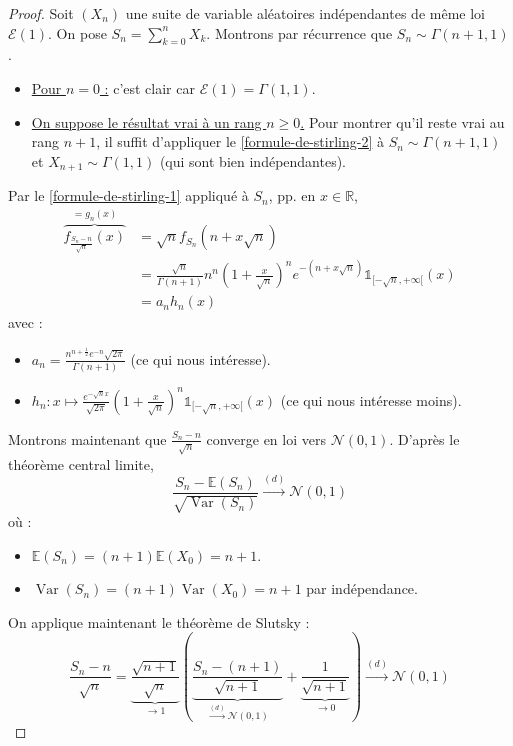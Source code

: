 	\begin{proof}
		Soit $(X_n)$ une suite de variable aléatoires indépendantes de même loi $\mathcal{E}(1)$. On pose $S_n = \sum_{k=0}^n X_k$. Montrons par récurrence que $S_n \sim \Gamma(n+1, 1)$.
		\begin{itemize}
			\item \uline{Pour $n = 0$ :} c'est clair car $\mathcal{E}(1) = \Gamma(1, 1)$.
			\item \uline{On suppose le résultat vrai à un rang $n \geq 0$.} Pour montrer qu'il reste vrai au rang $n+1$, il suffit d'appliquer le \cref{formule-de-stirling-2} à $S_n \sim \Gamma(n+1, 1)$ et $X_{n+1} \sim \Gamma(1, 1)$ (qui sont bien indépendantes).
		\end{itemize}
		Par le \cref{formule-de-stirling-1} appliqué à $S_n$, pp. en $x \in \mathbb{R}$,
		\begin{align*}
			\overbrace{f_{\frac{S_n - n}{\sqrt{n}}}(x)}^{= g_n(x)} & = \sqrt{n} f_{S_n} (n + x \sqrt{n}) \\
			& = \frac{\sqrt{n}}{\Gamma(n+1)} n^n \left(1 + \frac{x}{\sqrt{n}} \right)^n e^{-(n + x\sqrt{n})} \mathbb{1}_{[-\sqrt{n}, +\infty[}(x) \\
			& = a_n h_n(x)
		\end{align*}
		avec :
		\begin{itemize}
			\item $a_n = \frac{n^{n+\frac{1}{2}} e^{-n} \sqrt{2 \pi}}{\Gamma(n+1)}$ (ce qui nous intéresse).
			\item $h_n : x \mapsto \frac{e^{-\sqrt{n} x}}{\sqrt{2\pi}} \left( 1 + \frac{x}{\sqrt{n}} \right)^n \mathbb{1}_{[-\sqrt{n}, +\infty[}(x)$ (ce qui nous intéresse moins).
		\end{itemize}
		\medskip
		Montrons maintenant que $\frac{S_n - n}{\sqrt{n}}$ converge en loi vers $\mathcal{N}(0,1)$. D'après le théorème central limite,
		\[ \frac{S_n - \mathbb{E}(S_n)}{\sqrt{\operatorname{Var}(S_n)}} \overset{(d)}{\longrightarrow} \mathcal{N}(0,1) \]
		où :
		\begin{itemize}
			\item $\mathbb{E}(S_n) = (n+1) \mathbb{E}(X_0) = n+1$.
			\item $\operatorname{Var}(S_n) = (n+1) \operatorname{Var}(X_0) = n+1$ par indépendance.
		\end{itemize}
		On applique maintenant le théorème de Slutsky :
		\[ \frac{S_n - n}{\sqrt{n}} = \underbrace{\frac{\sqrt{n+1}}{\sqrt{n}}}_{\longrightarrow 1} \left( \underbrace{\frac{S_n - (n+1)}{\sqrt{n+1}}}_{\overset{(d)}{\longrightarrow} \mathcal{N}(0,1)} + \underbrace{\frac{1}{\sqrt{n+1}}}_{\longrightarrow 0} \right) \overset{(d)}{\longrightarrow} \mathcal{N}(0,1) \]

\end{proof}
